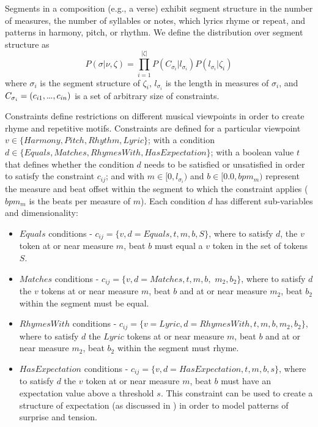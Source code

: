 \documentclass[letterpaper]{article}
\newcommand\mydots{\hbox to .75em{.\hss.\hss.}}
\begin{document}
Segments in a composition (e.g., a verse) exhibit segment structure in the number of measures, the number of syllables or notes, which lyrics rhyme or repeat, and patterns in harmony, pitch, or rhythm. We define the distribution over segment structure as
\[ P(\sigma|\nu,\zeta) =  \prod_{i=1}^{|\zeta|} P(C_{\sigma_i} | l_{\sigma_i}) P(l_{\sigma_i}|\zeta_i) \]
\noindent where $\sigma_i$ is the segment structure of $\zeta_i$, $l_{\sigma_i}$ is the length in measures of $\sigma_i$, and $C_{\sigma_i} = ({c_{i1},\mydots,c_{in}})$ is a set of arbitrary size of constraints. 

Constraints define restrictions on different musical viewpoints in order to create rhyme and repetitive motifs. Constraints are defined for a particular viewpoint $v\in\{Harmony, Pitch, Rhythm, Lyric\}$; with a condition $d\in\{Equals, Matches, RhymesWith, HasExpectation\}$; with a boolean value $t$ that defines whether the condition $d$ needs to be satisfied or unsatisfied in order to satisfy the constraint $c_{ij}$; and with $m\in[0,l_{\sigma_i})$ and $b\in[0.0,bpm_m)$ represent the measure and beat offset within the segment to which the constraint applies ($bpm_m$ is the beats per measure of $m$). Each condition $d$ has different sub-variables and dimensionality:

\begin{itemize}
\item $Equals$ conditions - $c_{ij} = \{v,d=Equals,t,m,b,S\}$, where to satisfy $d$, the $v$ token at or near measure $m$, beat $b$ must equal a $v$ token in the set of tokens $S$.
\item $Matches$ conditions - $c_{ij} = \{v,d=Matches,t,m,b,$ $m_2,b_2\}$, where to satisfy $d$ the $v$ tokens at or near measure $m$, beat $b$ and at or near measure $m_2$, beat $b_2$ within the segment must be equal.
\item $RhymesWith$ conditions - $c_{ij} = \{v=Lyric,d=RhymesWith,t,m,b,m_2,b_2\}$, where to satisfy $d$ the $Lyric$ tokens at or near measure $m$, beat $b$ and at or near measure $m_2$, beat $b_2$ within the segment must rhyme.
\item $HasExpectation$ conditions - $c_{ij} = \{v,d=HasExpectation,t,m,b,s\}$, where to satisfy $d$ the $v$ token at or near measure $m$, beat $b$ must have an expectation value above a threshold $s$. This constraint can be used to create a structure of expectation (as discussed in \cite{meyer2008emotion}) in order to model patterns of surprise and tension.
\end{itemize}
\end{document}

